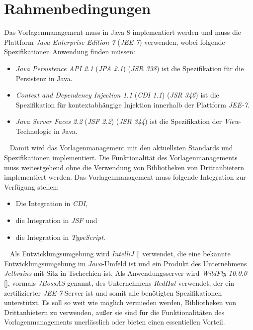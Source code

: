 \section{Rahmenbedingungen}
Das Vorlagenmanagement muss in Java 8 implementiert werden und muss die Plattform \emph{Java Enterprise Edition 7} (\emph{JEE-7}) verwenden, wobei folgende Spezifikationen Anwendung finden müssen:
\begin{itemize}
	\item \emph{Java Persistence API 2.1} (\emph{JPA 2.1}) (\emph{JSR 338}) ist die Spezifikation für die Persistenz in Java.
	\item \emph{Context and Dependency Injection 1.1} (\emph{CDI 1.1}) (\emph{JSR 346}) ist die Spezifikation für kontextabhängige Injektion innerhalb der Plattform \emph{JEE-7}.
	\item \emph{Java Server Faces 2.2} (\emph{JSF 2.2}) (\emph{JSR 344}) ist die Spezifikation der \emph{View}-Technologie in Java. 
\end{itemize}
\ \newline
Damit wird das Vorlagenmanagement mit den aktuellsten Standards und Spezifikationen implementiert. Die Funktionalität des Vorlagenmanagements muss weitestgehend ohne die Verwendung von Bibliotheken von Drittanbietern implementiert werden. Das Vorlagenmanagement muss folgende Integration zur Verfügung stellen:
\begin{itemize}
	\item Die Integration in \emph{CDI},
	\item die Integration in \emph{JSF} und
	\item die Integration in \emph{TypeScript}.
\end{itemize} 
\ \newline
Als Entwicklungsumgebung wird \emph{IntelliJ} [\cite{intelliJ}] verwendet, die eine bekannte Entwicklungsumgebung im \emph{Java}-Umfeld ist und ein Produkt des Unternehmens \emph{Jetbrains} mit Sitz in Tschechien ist. 
\newline
\newline
Als Anwendungsserver wird \emph{WildFly 10.0.0} [\cite{wildFly}], vormals \emph{JBossAS} genannt, des Unternehmens \emph{RedHat} verwendet, der ein zertifizierter \emph{JEE-7}-Server ist und somit alle benötigten Spezifikationen unterstützt. 
\newline
\newline
Es soll so weit wie möglich vermieden werden, Bibliotheken von Drittanbietern zu verwenden, außer sie sind für die Funktionalitäten des Vorlagenmanagements unerlässlich oder bieten einen essentiellen Vorteil.
